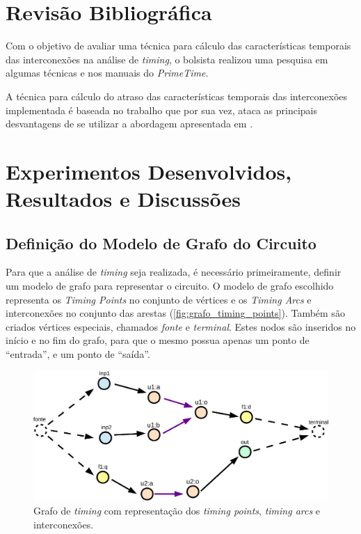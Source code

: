 \documentclass[
	12pt,				%
	openright,			%
	twoside,			%
	a4paper,			%
	english,			%
	french,				%
	spanish,			%
	brazil,				%
	]{abntex2}
\begin{document}
\section{Revisão Bibliográfica}

Com o objetivo de avaliar uma técnica para cálculo das características temporais das interconexões na análise de \textit{timing}, o bolsista realizou uma pesquisa em algumas técnicas e nos manuais do \textit{PrimeTime}. 

A técnica para cálculo do atraso das características temporais das interconexões implementada é baseada no trabalho \cite{PURI02} que por sua vez, ataca as principais desvantagens de se utilizar a abordagem apresentada em \cite{Kashyap00}.

\section{Experimentos Desenvolvidos, Resultados e Discussões}

\subsection{Definição do Modelo de Grafo do Circuito}
Para que a análise de \textit{timing} seja realizada, é necessário primeiramente, definir um modelo de grafo para representar o circuito. O modelo de grafo escolhido representa os \textit{Timing Points} no conjunto de vértices e os \textit{Timing Arcs} e interconexões no conjunto das arestas (\autoref{fig:grafo_timing_points}). Também são criados vértices especiais, chamados \textit{fonte} e \textit{terminal}. Estes nodos são inseridos no início e no fim do grafo, para que o mesmo possua apenas um ponto de ``entrada'', e um ponto de ``saída''.

\begin{figure}[ht]
\begin{center}
\caption{\label{fig:grafo_timing_points}Grafo de \textit{timing} com representação dos \textit{timing points}, \textit{timing arcs} e interconexões.}
\includegraphics[width=\linewidth]{img/grafo_timing_points.pdf}
\end{center}
\end{figure}
\end{document}
